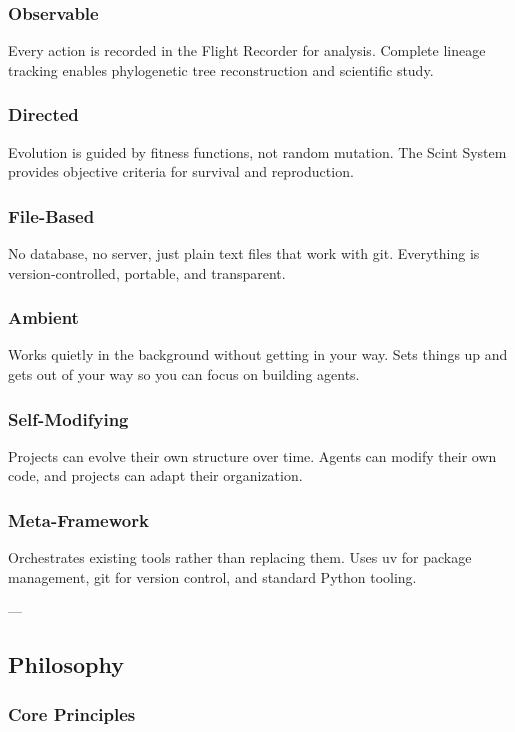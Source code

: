 \documentclass{article}
\begin{document}
\begin{itemize}
\begin{itemize}
\begin{itemize}
\begin{itemize}
\begin{itemize}
\begin{itemize}
\subsubsection{Observable}
Every action is recorded in the Flight Recorder for analysis. Complete lineage tracking enables phylogenetic tree reconstruction and scientific study.

\subsubsection{Directed}
Evolution is guided by fitness functions, not random mutation. The Scint System provides objective criteria for survival and reproduction.

\subsubsection{File-Based}
No database, no server, just plain text files that work with git. Everything is version-controlled, portable, and transparent.

\subsubsection{Ambient}
Works quietly in the background without getting in your way. Sets things up and gets out of your way so you can focus on building agents.

\subsubsection{Self-Modifying}
Projects can evolve their own structure over time. Agents can modify their own code, and projects can adapt their organization.

\subsubsection{Meta-Framework}
Orchestrates existing tools rather than replacing them. Uses uv for package management, git for version control, and standard Python tooling.

---

\subsection{Philosophy}

\subsubsection{Core Principles}


\end{itemize}
\end{itemize}
\end{itemize}
\end{itemize}
\end{itemize}
\end{itemize}
\end{document}
